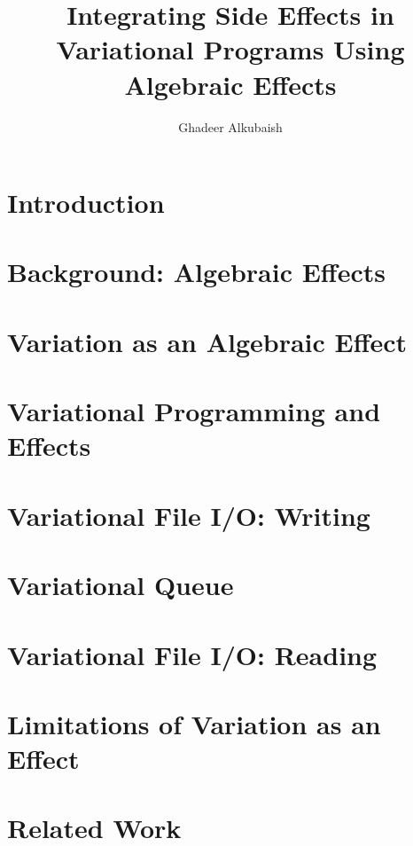 \documentclass[double,10pt] {beavtex}
\title{Integrating Side Effects in Variational Programs Using Algebraic Effects}
\author{Ghadeer Alkubaish}
\begin{document}
\maketitle
\mainmatter

\chapter{Introduction}
\label{sec:introduction}


\chapter{Background: Algebraic Effects}
\label{sec:background}


\chapter{Variation as an Algebraic Effect}
\label{sec:Variational_exe}


\chapter{Variational Programming and Effects}
\label{sec:Variational_effects}


\chapter{Variational File I/O: Writing}
\label{sec:file_IO_writing}


\chapter{Variational Queue}
\label{sec:queue_lib}


\chapter{Variational File I/O: Reading}
\label{sec:file_IO_reading}


\chapter{Limitations of Variation as an Effect}
\label{sec:efficiency}


\chapter{Related Work}
\label{sec:rw}

\end{document}

